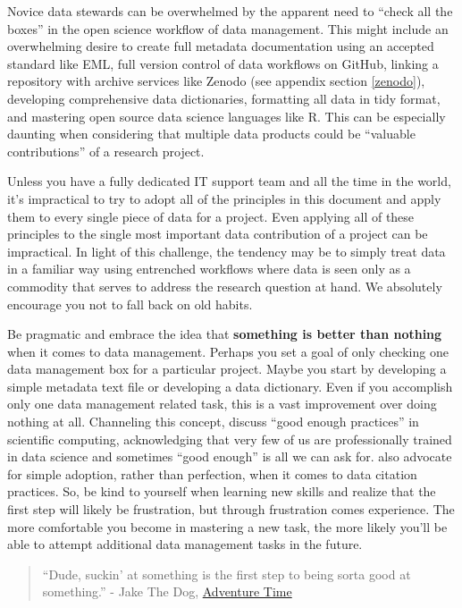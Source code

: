 \documentclass[
]{book}
\begin{document}
Novice data stewards can be overwhelmed by the apparent need to ``check all the boxes'' in the open science workflow of data management. This might include an overwhelming desire to create full metadata documentation using an accepted standard like EML, full version control of data workflows on GitHub, linking a repository with archive services like Zenodo (see appendix section \ref{zenodo}), developing comprehensive data dictionaries, formatting all data in tidy format, and mastering open source data science languages like R. This can be especially daunting when considering that multiple data products could be ``valuable contributions'' of a research project.

Unless you have a fully dedicated IT support team and all the time in the world, it's impractical to try to adopt all of the principles in this document and apply them to every single piece of data for a project. Even applying all of these principles to the single most important data contribution of a project can be impractical. In light of this challenge, the tendency may be to simply treat data in a familiar way using entrenched workflows where data is seen only as a commodity that serves to address the research question at hand. We absolutely encourage you not to fall back on old habits.

Be pragmatic and embrace the idea that \textbf{something is better than nothing} when it comes to data management. Perhaps you set a goal of only checking one data management box for a particular project. Maybe you start by developing a simple metadata text file or developing a data dictionary. Even if you accomplish only one data management related task, this is a vast improvement over doing nothing at all. Channeling this concept, \citet{Wilson17} discuss ``good enough practices'' in scientific computing, acknowledging that very few of us are professionally trained in data science and sometimes ``good enough'' is all we can ask for. \citet{Lowenberg21} also advocate for simple adoption, rather than perfection, when it comes to data citation practices. So, be kind to yourself when learning new skills and realize that the first step will likely be frustration, but through frustration comes experience. The more comfortable you become in mastering a new task, the more likely you'll be able to attempt additional data management tasks in the future.

\begin{quote}
``Dude, suckin' at something is the first step to being sorta good at something.'' - Jake The Dog, \href{https://en.wikipedia.org/wiki/Adventure_Time}{Adventure Time}
\end{quote}
\end{document}
